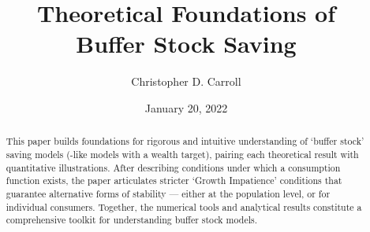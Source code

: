 \documentclass[BufferStockTheory]{subfiles}
\providecommand{\versn}{pdf} %
\begin{document}
\ifthenelse{\boolean{Web}}{    %
  \renewcommand{\versn}{Web}     %
  \renewcommand{\rootFromOut}{.} %
}{}  %



\title{Theoretical Foundations of \\ Buffer Stock Saving}

\author{Christopher D. Carroll\authNum}



\renewcommand{\forcedate}{January 20, 2022}\date{\forcedate}

\maketitle
\hypertarget{abstract}{}
\begin{abstract}
  This paper builds foundations for rigorous and intuitive understanding of `buffer stock' saving models (\cite{bewleyPIH}-like models with a wealth target), pairing each theoretical result with quantitative illustrations.  After describing conditions under which a consumption function exists, the paper articulates stricter `Growth Impatience' conditions that guarantee alternative forms of stability --- either at the population level, or for individual consumers.  Together, the numerical tools and analytical results constitute a comprehensive toolkit for understanding buffer stock models.
\end{abstract}

\hypertarget{links}{}
\end{document}
